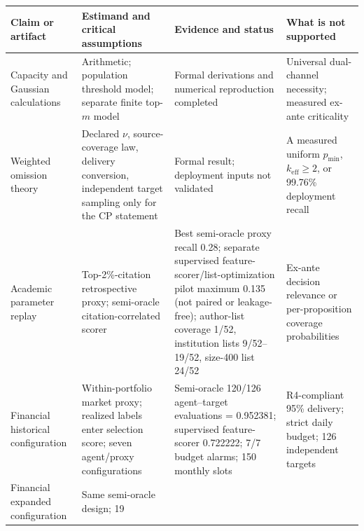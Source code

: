 \documentclass[
  11pt]{article}
\begin{document}
\begin{longtable}[]{@{}
  >{\raggedright\arraybackslash}p{}
  >{\raggedright\arraybackslash}p{}
  >{\raggedright\arraybackslash}p{}
  >{\raggedright\arraybackslash}p{}@{}}
\toprule\noalign{}
\begin{minipage}[b]{\linewidth}\raggedright
Claim or artifact
\end{minipage} & \begin{minipage}[b]{\linewidth}\raggedright
Estimand and critical assumptions
\end{minipage} & \begin{minipage}[b]{\linewidth}\raggedright
Evidence and status
\end{minipage} & \begin{minipage}[b]{\linewidth}\raggedright
What is not supported
\end{minipage} \\
\midrule\noalign{}
\endhead
\bottomrule\noalign{}
\endlastfoot
Capacity and Gaussian calculations & Arithmetic; population threshold
model; separate finite top-\(m\) model & Formal derivations and
numerical reproduction completed & Universal dual-channel necessity;
measured ex-ante criticality \\
Weighted omission theory & Declared \(\nu\), source-coverage law,
delivery conversion, independent target sampling only for the CP
statement & Formal result; deployment inputs not validated & A measured
uniform \(p_{\min}\), \(k_{\mathrm{eff}}\ge2\), or 99.76\% deployment
recall \\
Academic parameter replay & Top-2\%-citation retrospective proxy;
semi-oracle citation-correlated scorer & Best semi-oracle proxy recall
0.28; separate supervised feature-scorer/list-optimization pilot maximum
0.135 (not paired or leakage-free); author-list coverage 1/52,
institution lists 9/52--19/52, size-400 list 24/52 & Ex-ante decision
relevance or per-proposition coverage probabilities \\
Financial historical configuration & Within-portfolio market proxy;
realized labels enter selection score; seven agent/proxy configurations
& Semi-oracle 120/126 agent--target evaluations = 0.952381; supervised
feature-scorer 0.722222; 7/7 budget alarms; 150 monthly slots &
R4-compliant 95\% delivery; strict daily budget; 126 independent
targets \\
Financial expanded configuration & Same semi-oracle design; 19

\end{longtable}
\end{document}
